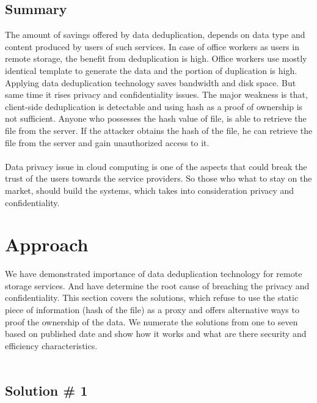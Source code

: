\documentclass[12pt]{article}
\begin{document}
\subsection{Summary}
\label{subsub:AttackSummary}
The amount of savings offered by data deduplication, depends on data type and content produced by users of such services.\cite{ratio}  In case of office workers as users in remote storage, the benefit from deduplication is high. Office workers use mostly identical template to generate the data and the portion of duplication is high. Applying data deduplication technology saves bandwidth and disk space.  But same time it rises privacy and confidentiality issues. The major weakness is that, client-side deduplication is detectable and using hash as a proof of ownership is not sufficient. Anyone who possesses the hash value of file, is able to retrieve the file from the server.  If the attacker  obtains the hash of the file, he can retrieve the file from the server and gain unauthorized access to it.\\\\
Data privacy issue in cloud computing is one of the aspects that could break the trust of the users towards the service providers. So those who what to stay on the market, should build the systems, which takes into consideration privacy and confidentiality.

\pagebreak

\section{Approach}
\label{sec:4}

We have demonstrated importance of data deduplication technology for remote storage services. And have determine the root  cause of breaching the privacy and confidentiality. This section covers the solutions, which refuse to use the static piece of information (hash of the file) as a proxy and offers alternative ways to proof the ownership of the data. We numerate the solutions from one to seven based on published date and show how it works and what are there security and efficiency characteristics. \\\\
\subsection{Solution \# 1}
\label{sub:Soltuion1}
\end{document}

